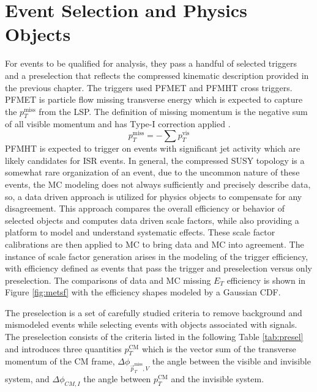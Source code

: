 \section{Event Selection and Physics Objects}
 For events to be qualified for analysis, they pass a handful of selected triggers and a preselection that reflects the compressed kinematic description provided in the previous chapter. The triggers used PFMET and PFMHT cross triggers. PFMET is particle flow missing transverse energy which is expected to capture the $p_T^{\text{miss}}$ from the LSP. The definition of missing momentum is the negative sum of all visible momentum and has Type-I correction applied \cite{CMS:2008oxa}. 
\begin{equation}
p_T^{\text{miss}} = -\sum{p_T^{\text{vis}}}
\end{equation} 
PFMHT is expected to trigger on events with significant jet activity which are likely candidates for ISR events.  In general, the compressed SUSY topology is a somewhat rare organization of an event, due to the uncommon nature of these events, the MC modeling does not always sufficiently and precisely describe data, so,  a data driven approach is utilized for physics objects to compensate for any disagreement. This approach compares the overall efficiency or behavior of selected objects and computes data driven scale factors, while also providing a platform to model and understand systematic effects. These scale factor calibrations are then applied to MC to bring data and MC into agreement. The instance of scale factor generation arises in the modeling of the trigger efficiency, with efficiency defined as events that pass the trigger and preselection versus only preselection. The comparisons of data and MC missing $E_T$ efficiency is shown in Figure \ref{fig:metsf} with the efficiency shapes modeled by a Gaussian CDF.  


The preselection is a set of carefully studied criteria to remove background and mismodeled events while selecting events with objects associated with signals. The preselection consists of the criteria listed in the following Table \ref{tab:presel} and introduces three quantities $p_T^{\text{CM}}$ which is the vector sum of the transverse momentum of the CM frame, $\Delta \phi_{\vec{p}_T^{\text{miss}}, V}$ the angle between the visible and invisible system, and $\Delta\phi_{CM,I}$ the angle between $p_T^{\text{CM}}$ and the invisible system.

